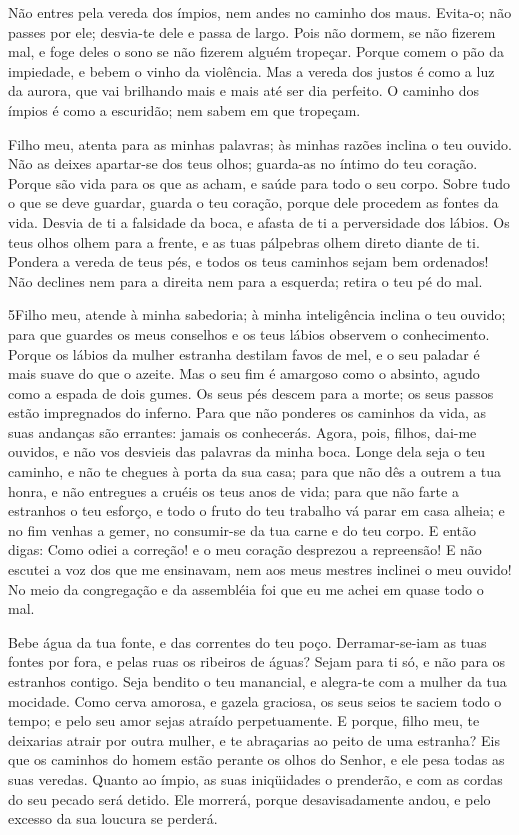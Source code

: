 Não entres pela vereda dos ímpios, nem andes no caminho dos maus.
Evita-o; não passes por ele; desvia-te dele e passa de largo.
Pois não dormem, se não fizerem mal, e foge deles o sono se
não fizerem alguém tropeçar. Porque comem o pão da impiedade,
e bebem o vinho da violência. Mas a vereda dos justos é como
a luz da aurora, que vai brilhando mais e mais até ser dia perfeito.
O caminho dos ímpios é como a escuridão; nem sabem em que
tropeçam.

Filho meu, atenta para as minhas palavras; às minhas razões
inclina o teu ouvido. Não as deixes apartar-se dos teus
olhos; guarda-as no íntimo do teu coração. Porque são vida
para os que as acham, e saúde para todo o seu corpo. Sobre
tudo o que se deve guardar, guarda o teu coração, porque dele
procedem as fontes da vida. Desvia de ti a falsidade da boca,
e afasta de ti a perversidade dos lábios. Os teus olhos olhem
para a frente, e as tuas pálpebras olhem direto diante de ti.
Pondera a vereda de teus pés, e todos os teus caminhos sejam
bem ordenados! Não declines nem para a direita nem para a
esquerda; retira o teu pé do mal.

\medskip

\lettrine{5}{}Filho meu, atende à minha sabedoria; à minha
inteligência inclina o teu ouvido; para que guardes os meus
conselhos e os teus lábios observem o conhecimento. Porque os
lábios da mulher estranha destilam favos de mel, e o seu paladar é
mais suave do que o azeite. Mas o seu fim é amargoso como o
absinto, agudo como a espada de dois gumes. Os seus pés descem
para a morte; os seus passos estão impregnados do inferno. Para
que não ponderes os caminhos da vida, as suas andanças são errantes:
jamais os conhecerás. Agora, pois, filhos, dai-me ouvidos, e não
vos desvieis das palavras da minha boca. Longe dela seja o teu
caminho, e não te chegues à porta da sua casa; para que não dês
a outrem a tua honra, e não entregues a cruéis os teus anos de vida;
para que não farte a estranhos o teu esforço, e todo o fruto
do teu trabalho vá parar em casa alheia; e no fim venhas a
gemer, no consumir-se da tua carne e do teu corpo. E então
digas: Como odiei a correção! e o meu coração desprezou a
repreensão! E não escutei a voz dos que me ensinavam, nem aos
meus mestres inclinei o meu ouvido! No meio da congregação e
da assembléia foi que eu me achei em quase todo o mal.

Bebe água da tua fonte, e das correntes do teu poço.
Derramar-se-iam as tuas fontes por fora, e pelas ruas os
ribeiros de águas? Sejam para ti só, e não para os estranhos
contigo. Seja bendito o teu manancial, e alegra-te com a
mulher da tua mocidade. Como cerva amorosa, e gazela
graciosa, os seus seios te saciem todo o tempo; e pelo seu amor
sejas atraído perpetuamente. E porque, filho meu, te
deixarias atrair por outra mulher, e te abraçarias ao peito de uma
estranha? Eis que os caminhos do homem estão perante os olhos
do Senhor, e ele pesa todas as suas veredas. Quanto ao ímpio,
as suas iniqüidades o prenderão, e com as cordas do seu pecado será
detido. Ele morrerá, porque desavisadamente andou, e pelo
excesso da sua loucura se perderá.

